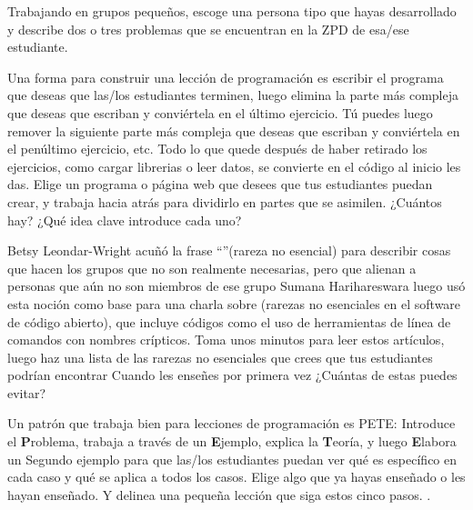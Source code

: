 Trabajando en grupos pequeños,
escoge una persona tipo que hayas desarrollado
y describe dos o tres problemas que se encuentran en la ZPD de esa/ese estudiante.
 
 
Una forma para construir una lección de programación
es escribir el programa que deseas que las/los estudiantes terminen,
luego elimina la parte más compleja que deseas que escriban
y conviértela en el último ejercicio.
Tú puedes luego remover la siguiente parte más compleja que deseas que escriban
y conviértela en el penúltimo ejercicio, etc.
Todo lo que quede después de haber retirado los ejercicios,
como cargar librerias o leer datos,
se convierte en el código al inicio les das.
 Elige un programa o página web que desees que
tus estudiantes puedan crear,
y trabaja hacia atrás para dividirlo en partes que se asimilen.
¿Cuántos hay?
¿Qué idea clave introduce cada uno?
 
 
Betsy Leondar-Wright acuñó la frase
``''(rareza no esencial)
para describir cosas que hacen los grupos
que no son realmente necesarias,
pero que alienan a personas que aún no son miembros de ese grupo
Sumana Harihareswara luego usó esta noción
como base para una charla sobre
(rarezas no esenciales en el software de código abierto),
que incluye códigos como el uso de herramientas de línea de comandos con nombres crípticos.
Toma unos minutos para leer estos artículos,
luego haz una lista de las rarezas no esenciales que crees
que tus estudiantes podrían encontrar
Cuando les enseñes por primera vez
¿Cuántas de estas puedes evitar?
 

Un patrón que trabaja bien para lecciones de programación es PETE:
Introduce el  \textbf{P}roblema,
trabaja a través de un \textbf{E}jemplo,
explica la \textbf{T}eoría,
y luego \textbf{E}labora un Segundo ejemplo
para que las/los estudiantes puedan ver qué es específico en cada caso
y qué se aplica a todos los casos.
Elige algo que ya hayas enseñado o les hayan enseñado.
Y delinea una pequeña lección que siga estos cinco pasos.
.

